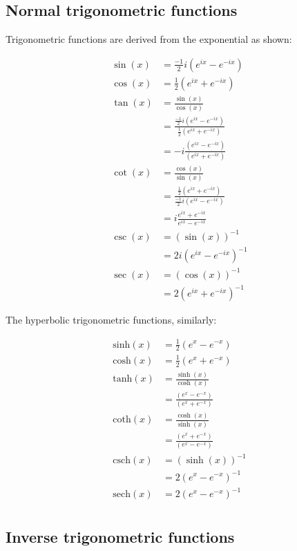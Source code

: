 \documentclass[10pt]{article}
\begin{document}
\begin{multicols}{2}
\subsection{Normal trigonometric functions}

Trigonometric functions are derived from the exponential as shown:

\begin{align*}
    \sin(x) &= \frac{-1}{2}i (e^{ix} - e^{-ix}) \\
    \cos(x) &= \frac{1}{2} (e^{ix} + e^{-ix}) \\
    \tan(x) &= \frac{\sin(x)}{\cos(x)} \\
    &= \frac{\frac{-1}{2}i (e^{ix} - e^{-ix})}{\frac{1}{2} (e^{ix} + e^{-ix})} \\
    &= -i \frac{(e^{ix} - e^{-ix})}{(e^{ix} + e^{-ix})} \\
    \cot(x) &= \frac{\cos(x)}{\sin(x)} \\
    &= \frac{\frac{1}{2} (e^{ix} + e^{-ix})}{\frac{-1}{2}i (e^{ix} - e^{-ix})} \\
    &= i \frac{e^{ix} + e^{-ix}}{e^{ix} - e^{-ix}} \\
    \csc(x) &= (\sin(x))^{-1} \\
    &= 2i (e^{ix} - e^{-ix})^{-1} \\
    \sec(x) &= (\cos(x))^{-1} \\
    &= 2 (e^{ix} + e^{-ix})^{-1}
\end{align*}

The hyperbolic trigonometric functions, similarly:

\begin{align*}
    \mathrm{sinh}(x) &= \frac{1}{2} (e^x - e^{-x}) \\
    \mathrm{cosh}(x) &= \frac{1}{2} (e^x + e^{-x}) \\
    \mathrm{tanh}(x) &= \frac{\sinh(x)}{\cosh(x)} \\
    &= \frac{(e^x - e^{-x})}{(e^x + e^{-x})} \\
    \mathrm{coth}(x) &= \frac{\cosh(x)}{\sinh(x)} \\
    &= \frac{(e^x + e^{-x})}{(e^x - e^{-x})} \\
    \mathrm{csch}(x) &= (\sinh(x))^{-1} \\
    &= 2 (e^x - e^{-x})^{-1} \\
    \mathrm{sech}(x) &= 2 (e^x - e^{-x})^{-1} \\
\end{align*}

\subsection{Inverse trigonometric functions}


\end{multicols}
\end{document}
